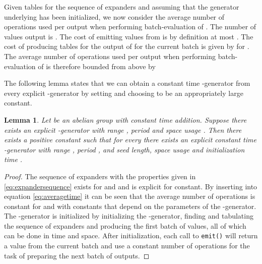 \documentclass[a4paper,11pt]{article}
\theoremstyle{plain}
\newtheorem{lemma}{Lemma}
\theoremstyle{definition}
\begin{document}
Given tables for the sequence of expanders and assuming that the generator underlying  has been initialized, we now consider the average number of operations used per output when performing batch-evaluation of .
The number of values output is .
The cost of emitting  values from  is by definition at most .
The cost of producing tables for the output of  for the current batch is given by  for .
The average number of operations used per output when performing batch-evaluation of  is therefore bounded from above by

The following lemma states that we can obtain a constant time -generator from every explicit -generator by setting  and choosing  to be an appropriately large constant.  
\begin{lemma} \label{lem:general}
Let  be an abelian group with constant time addition. 
Suppose there exists an explicit -generator with range , period  and space usage .
Then there exists a positive constant  such that for every  
there exists an explicit constant time -generator with range , period , and seed length, space usage and initialization time .
\end{lemma}
\begin{proof}
The sequence of expanders  with the properties given in \eqref{eq:expandersequence} exists for  and  and is explicit for  constant.
By inserting  into equation \eqref{eq:averagetime} it can be seen that the average number of operations is constant for  and  with constants that depend on the parameters of the -generator. 
The -generator is initialized by initializing the -generator, finding and tabulating the sequence of expanders and producing the first batch of values, all of which can be done in  time and space.
After initialization, each call to \texttt{emit()} will return a value from the current batch and use a constant number of operations for the task of preparing the next batch of outputs.    
\end{proof}
\end{document}
